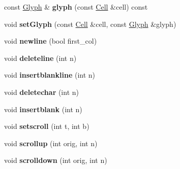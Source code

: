 \begin{DoxyCompactItemize}
\item 
\mbox{\label{classscreen_1_1ScreenImpl_a5402a85fcf03cf623c55f39d15f906b3}} 
const \mbox{\hyperlink{structscreen_1_1Glyph}{Glyph}} \& {\bfseries glyph} (const \mbox{\hyperlink{structCell}{Cell}} \&cell) const
\item 
\mbox{\label{classscreen_1_1ScreenImpl_a1a743f4e2ff44abe1fbf967e4550a5cd}} 
void {\bfseries set\+Glyph} (const \mbox{\hyperlink{structCell}{Cell}} \&cell, const \mbox{\hyperlink{structscreen_1_1Glyph}{Glyph}} \&glyph)
\item 
\mbox{\label{classscreen_1_1ScreenImpl_a57fdc5605c617ec85c399507d672257b}} 
void {\bfseries newline} (bool first\+\_\+col)
\item 
\mbox{\label{classscreen_1_1ScreenImpl_a18f0ca4a72e8475c18eac38c028ace76}} 
void {\bfseries deleteline} (int n)
\item 
\mbox{\label{classscreen_1_1ScreenImpl_a0f77933818db82370e661ca18e58af2e}} 
void {\bfseries insertblankline} (int n)
\item 
\mbox{\label{classscreen_1_1ScreenImpl_a58706709760cbfafbce846eb049d2d50}} 
void {\bfseries deletechar} (int n)
\item 
\mbox{\label{classscreen_1_1ScreenImpl_a7072a42fad567d975e9285fe9ccf045b}} 
void {\bfseries insertblank} (int n)
\item 
\mbox{\label{classscreen_1_1ScreenImpl_a3f9077f66d97229cd7b2f189e880867b}} 
void {\bfseries setscroll} (int t, int b)
\item 
\mbox{\label{classscreen_1_1ScreenImpl_ae3cdb27a3bc51dbb75f51fdb9376267d}} 
void {\bfseries scrollup} (int orig, int n)
\item 
\mbox{\label{classscreen_1_1ScreenImpl_ac64adf6da2747704e28593a6da3254f4}} 
void {\bfseries scrolldown} (int orig, int n)
\item 

\end{DoxyCompactItemize}
